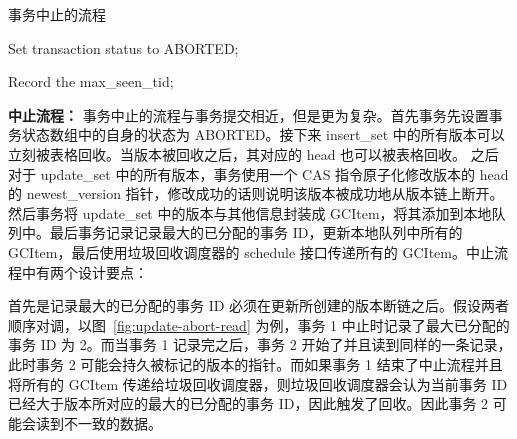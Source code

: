 \begin{algorithm}[h]
    \caption{事务中止的流程}
    \label{alg:abort}
    \BlankLine
    Set transaction status to ABORTED;



    Record the max\_seen\_tid;



\end{algorithm}

\textbf{中止流程：} 事务中止的流程与事务提交相近，但是更为复杂。首先事务先设置事务状态数组中的自身的状态为 ABORTED。接下来 insert\_set 中的所有版本可以立刻被表格回收。当版本被回收之后，其对应的 head 也可以被表格回收。
之后对于 update\_set 中的所有版本，事务使用一个 CAS 指令原子化修改版本的 head 的 newest\_version 指针，修改成功的话则说明该版本被成功地从版本链上断开。然后事务将 update\_set 中的版本与其他信息封装成 GCItem，将其添加到本地队列中。最后事务记录记录最大的已分配的事务 ID，更新本地队列中所有的 GCItem，最后使用垃圾回收调度器的 schedule 接口传递所有的 GCItem。中止流程中有两个设计要点：

首先是记录最大的已分配的事务 ID 必须在更新所创建的版本断链之后。假设两者顺序对调，以图~\ref{fig:update-abort-read} 为例，事务 1 中止时记录了最大已分配的事务 ID 为 2。而当事务 1 记录完之后，事务 2 开始了并且读到同样的一条记录，此时事务 2 可能会持久被标记的版本的指针。而如果事务 1 结束了中止流程并且将所有的 GCItem 传递给垃圾回收调度器，则垃圾回收调度器会认为当前事务 ID 已经大于版本所对应的最大的已分配的事务 ID，因此触发了回收。因此事务 2 可能会读到不一致的数据。


